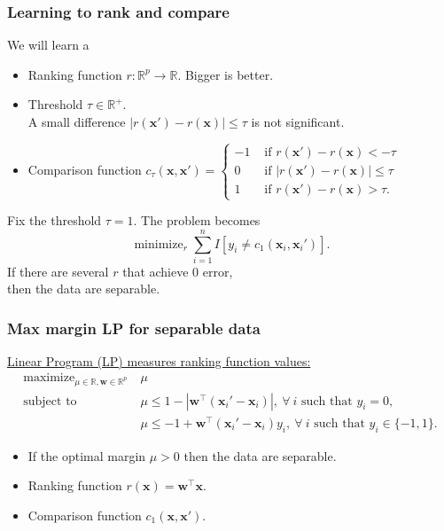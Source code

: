 \documentclass{beamer}
\DeclareMathOperator*{\maximize}{maximize}
\DeclareMathOperator*{\minimize}{minimize}
\newcommand{\RR}{\mathbb R}
\begin{document}
\begin{frame}
  \frametitle{Learning to rank and compare}
  We will learn a
  \begin{itemize}
  \item Ranking function $r:\RR^p\rightarrow\RR$. Bigger is better.
  \item Threshold $\tau\in\RR^+$. \\A small difference
    $|r(\mathbf x')-r(\mathbf x)|\leq \tau$ is not significant.
  \item Comparison function $c_\tau(\mathbf x, \mathbf x') =
  \begin{cases}
    -1 & \text{ if }r(\mathbf x')-r(\mathbf x) < -\tau\\
    0 & \text{ if }|r(\mathbf x')-r(\mathbf x)|\leq \tau\\
    1 & \text{ if }r(\mathbf x')-r(\mathbf x) > \tau.
  \end{cases}
$
\end{itemize}
Fix the threshold $\tau=1$. The problem becomes
$$\minimize_{r} \sum_{i=1}^n 
I\left[ y_i\neq c_1(\mathbf x_i, \mathbf x_i') \right].$$
If there are several $r$ that achieve 0 error, \\
then the data are separable.
\end{frame}

\begin{frame}
  \frametitle{Max margin LP for separable data}
  \underline{Linear Program (LP) measures ranking function values:}
  \begin{equation*}
  \begin{aligned}
    \maximize_{\mu\in\RR, \mathbf w\in\RR^p}\ & \mu \\
    \text{subject to}\ & 
    \mu \leq 1-|\mathbf w^\intercal (\mathbf x_i' - \mathbf x_i)|,\
    \forall\  i\text{ such that }y_i=0,\\
    &\mu \leq -1 +  
    \mathbf w^\intercal(\mathbf x_i'-\mathbf x_i)y_i,
    \ \forall\ i\text{ such that }y_i\in\{-1,1\}.
  \end{aligned}
\end{equation*}
\begin{itemize}
\item If the optimal margin $\mu>0$ then the data are separable.
\item Ranking function $r(\mathbf x) = \mathbf w^\intercal \mathbf x$.
\item Comparison function $c_1(\mathbf x, \mathbf x')$.
\end{itemize}
\end{frame}
\end{document}

